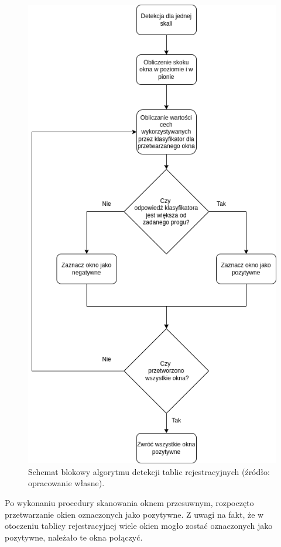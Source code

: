 \begin{figure}[!ht]
    \centering
    \includegraphics[scale=0.35]{Pictures/detection_alg}
    \caption{Schemat blokowy algorytmu detekcji tablic rejestracyjnych (źródło: opracowanie własne).}
    \label{fig:detection_alg}
\end{figure}
\FloatBarrier
Po wykonaniu procedury skanowania oknem przesuwnym, rozpoczęto przetwarzanie okien oznaczonych jako pozytywne.
Z uwagi na fakt, że w otoczeniu tablicy rejestracyjnej wiele okien mogło zostać oznaczonych jako pozytywne, należało te okna połączyć.
